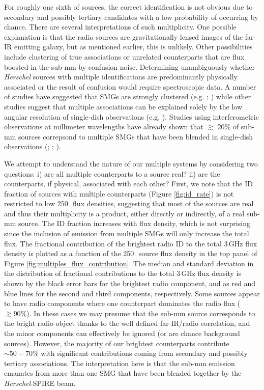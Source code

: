 For roughly one sixth of sources, the correct identification is not obvious due to secondary and possibly tertiary candidates with a low probability of occurring by chance. There are several interpretations of such multiplicity. One possible explanation is that the radio sources are gravitationally lensed images of the far-IR emitting galaxy, but as mentioned earlier, this is unlikely. Other possibilities include clustering of true associations or unrelated counterparts that are flux boosted in the sub-mm by confusion noise. Determining unambiguously whether \textit{Herschel} sources with multiple identifications are predominantly physically associated or the result of confusion would require spectroscopic data. A number of studies have suggested that SMGs are strongly clustered (e.g. \citealt{Blain_2004}; \citealt{Weiss_2009}) while other studies suggest that multiple associations can be explained solely by the low angular resolution of single-dish observations (e.g. \citealt{Williams_2011}). Studies using interferometric observations at millimeter wavelengths have already shown that $\gtrsim$ 20\% of sub-mm sources correpsond to multiple SMGs that have been blended in single-dish observations (\citealt{Karim_2013}; \citealt{Simpson_2015}; \citealt{Stach_2018}). 

We attempt to understand the nature of our multiple systems by considering two questions: i) are all multiple counterparts to a source real? ii) are the counterparts, if physical, associated with each other? First, we note that the ID fraction of sources with multiple counterparts (Figure \ref{fig:id_rate}) is not restricted to low 250\,\micron\ flux densities, suggesting that most of the sources are real and thus their multiplicity is a product, either directly or indirectly, of a real sub-mm source. The ID fraction increases with flux density, which is not surprising since the inclusion of emission from multiple SMGs will only increase the total flux. The fractional contribution of the brightest radio ID to the total 3\,GHz flux density is plotted as a function of the 250\,\micron\ source flux density in the top panel of Figure \ref{fig:multiples_flux_contribution}. The median and standard deviation in the distribution of fractional contributions to the total 3\,GHz flux density is shown by the black error bars for the brightest radio component, and as red and blue lines for the second and third components, respectively. Some sources appear to have radio components where one counterpart dominates the radio flux ($\gtrsim 90\%$). In these cases we may presume that the sub-mm source corresponds to the bright radio object thanks to the well defined far-IR/radio correlation, and the minor components can effectively be ignored (or are chance background sources). However, the majority of our brightest counterparts contribute $\sim 50 - 70\%$ with significant contributions coming from secondary and possibly tertiary associations. The interpretation here is that the sub-mm emission emanates from more than one SMG that have been blended together by the \textit{Herschel}-SPIRE beam.

